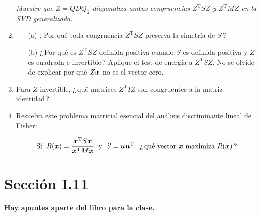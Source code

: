 \documentclass[12pt,a4paper]{article}
\newcommand{\bi}[1]{\hbox{\boldmath$#1$}}
\newcommand\1{\mbox{\,\vrule height-0.8pt depth1.0pt width2pc\,}}
\newcommand\2{\mbox{\,\vrule height-0.8pt depth1.0pt width1pc\,}}
\DeclareRobustCommand\transp{^{\mathrm{T}}}
\newcommand{\bu}{\hbox{\boldmath$u$}}
\begin{document}
\begin{enumerate}
\emph{Muestre que $Z=QDQ_2$ diagonaliza ambas congruencias $Z\transp SZ$ y $Z\transp MZ$ en la SVD generalizada}.%
\item
\begin{itemize}
\item [(a)] ¿\,Por qué toda congruencia  $Z\transp SZ$ preserva la simetría de $S$\,?
\item [(b)] ¿\,Por qué es $Z\transp SZ$ definida positiva cuando $S$ es definida positiva y $Z$ es cuadrada e invertible\,? Aplique el test de energía a $Z\transp SZ$. No se olvide de explicar por qué $Z\bi{x}$ no es el vector cero.
\end{itemize}

\item Para $Z$ invertible, ¿\,qué matrices $Z\transp IZ$ son congruentes a la matriz identidad\,?
\item Resuelva este problema matricial esencial del análisis discriminante lineal de Fisher: 

\vspace{-11pt}
$$\text{Si \;} R(\bi{x})=\dfrac{\bi{x}\transp S\bi{x}}{\bi{x}\transp M\bi{x}}\text{\; y \;} S=\bu\bu\transp\text{\quad¿\,qué vector } \bi{x}\text{ maximiza }R(\bi{x})\,?$$


\end{enumerate}


\section{Sección I.11}
  {\bf Hay apuntes aparte del libro para la clase.}
\end{document}

